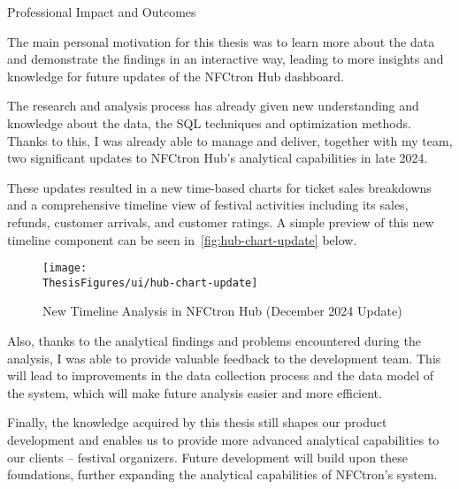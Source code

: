 \begin{section}{Professional Impact and Outcomes}
	\label{sec:future-impact}

	The main personal motivation for this thesis was to learn more about the data and demonstrate the findings in an interactive way, leading to more insights and knowledge for future updates of the NFCtron Hub dashboard.

	The research and analysis process has already given new understanding and knowledge about the data, the SQL techniques and optimization methods.
	Thanks to this, I was already able to manage and deliver, together with my team, two significant updates to NFCtron Hub's analytical capabilities in late 2024.

	These updates resulted in a new time-based charts for ticket sales breakdowns and a comprehensive timeline view of festival activities including its sales, refunds, customer arrivals, and customer ratings.
	A simple preview of this new timeline component can be seen in~\autoref{fig:hub-chart-update} below.

	\begin{figure}[h]
		\centering
		\texttt{[image: \\ThesisFigures/ui/hub-chart-update]}
		\caption{New Timeline Analysis in NFCtron Hub (December 2024 Update)}
		\label{fig:hub-chart-update}
	\end{figure}

	Also, thanks to the analytical findings and problems encountered during the analysis, I was able to provide valuable feedback to the development team.
	This will lead to improvements in the data collection process and the data model of the system, which will make future analysis easier and more efficient.

	Finally, the knowledge acquired by this thesis still shapes our product development and enables us to provide more advanced analytical capabilities to our clients – festival organizers.
	Future development will build upon these foundations, further expanding the analytical capabilities of NFCtron's system.
\end{section}